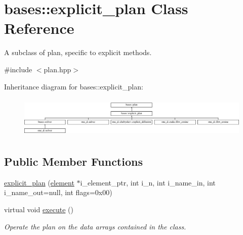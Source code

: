 \hypertarget{classbases_1_1explicit__plan}{\section{bases\-:\-:explicit\-\_\-plan Class Reference}
\label{classbases_1_1explicit__plan}
}


A subclass of plan, specific to explicit methods.  




{\ttfamily \#include $<$plan.\-hpp$>$}

Inheritance diagram for bases\-:\-:explicit\-\_\-plan\-:\begin{figure}[H]
\begin{center}
\leavevmode
\includegraphics[height=2.008969cm]{classbases_1_1explicit__plan}
\end{center}
\end{figure}
\subsection*{Public Member Functions}
\begin{DoxyCompactItemize}
\item 
\hyperlink{classbases_1_1explicit__plan_a4c4c1f48e79e10dd6f85610f5814ba7f}{explicit\-\_\-plan} (\hyperlink{classbases_1_1element}{element} $\ast$i\-\_\-element\-\_\-ptr, int i\-\_\-n, int i\-\_\-name\-\_\-in, int i\-\_\-name\-\_\-out=null, int flags=0x00)
\begin{DoxyCompactList}\small\item\em \end{DoxyCompactList}\item 
virtual void \hyperlink{classbases_1_1explicit__plan_a21bcba4d429590031bba41ee2a48a4ef}{execute} ()
\begin{DoxyCompactList}\small\item\em Operate the plan on the data arrays contained in the class. \end{DoxyCompactList}\end{DoxyCompactItemize}
